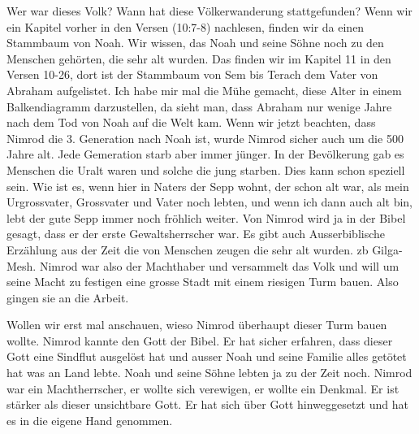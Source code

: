 \documentclass[14pt]{../../inc/mybib}
\begin{document}
    Wer war dieses Volk? Wann hat diese Völkerwanderung stattgefunden? Wenn wir ein Kapitel vorher in den Versen  (10:7-8) nachlesen, finden wir da einen Stammbaum von Noah. Wir wissen, das Noah und seine Söhne noch zu den Menschen gehörten, die sehr alt wurden. Das finden wir im Kapitel 11 in den Versen 10-26, dort ist der Stammbaum von Sem bis Terach dem Vater von Abraham aufgelistet. Ich habe mir mal die Mühe gemacht, diese Alter in einem Balkendiagramm darzustellen, da sieht man, dass Abraham nur wenige Jahre nach dem Tod von Noah auf die Welt kam. Wenn wir jetzt beachten, dass Nimrod die 3. Generation nach Noah ist, wurde Nimrod sicher auch um die 500 Jahre alt. Jede Gemeration starb aber immer jünger. In der Bevölkerung gab es Menschen die Uralt waren und solche die jung starben. Dies kann schon speziell sein. Wie ist es, wenn hier in Naters der Sepp wohnt, der schon alt war, als mein Urgrossvater, Grossvater und Vater noch lebten, und wenn ich dann auch alt bin, lebt der gute Sepp immer noch fröhlich weiter. Von Nimrod wird ja in der Bibel gesagt, dass er der erste Gewaltsherrscher war. Es gibt auch Ausserbiblische Erzählung aus der Zeit die von Menschen zeugen die sehr alt wurden. zb Gilga-Mesh. Nimrod war also der Machthaber und versammelt das Volk und will um seine Macht zu festigen eine grosse Stadt mit einem riesigen Turm bauen. Also gingen sie an die Arbeit. 

    Wollen wir erst mal anschauen, wieso Nimrod überhaupt dieser Turm bauen wollte. Nimrod kannte den Gott der Bibel. Er hat sicher erfahren, dass dieser Gott eine Sindflut ausgelöst hat und ausser Noah und seine Familie alles getötet hat was an Land lebte. Noah und seine Söhne lebten ja zu der Zeit noch. Nimrod war ein Machtherrscher, er wollte sich verewigen, er wollte ein Denkmal. Er ist stärker als dieser unsichtbare Gott. Er hat sich über Gott hinweggesetzt und hat es in die eigene Hand genommen.
    
\end{document}
